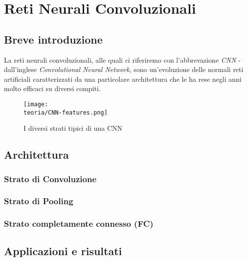 
\chapter{Reti Neurali Convoluzionali} %

\label{Capitolo3} %
\def \teoria {Figures/teoria}


\section{Breve introduzione}
La reti neurali convoluzionali, alle quali ci riferiremo con l'abbrevazione \emph{CNN} - dall'inglese \emph{Convolutional Neural Network}, sono un'evoluzione delle normali reti artificiali caratterizzati da una particolare architettura che le ha rese negli anni molto efficaci su diversi compiti. 


\begin{figure}[h!]
 \centering
 \texttt{[image: \\teoria/CNN-features.png]} 
 \caption{I diversi strati tipici di una CNN}
 \label{fig:conv1}
\end{figure}


\section{Architettura}
\subsection{Strato di Convoluzione}

\subsection{Strato di Pooling}

\subsection{Strato completamente connesso (FC)}



\section{Applicazioni e risultati}


